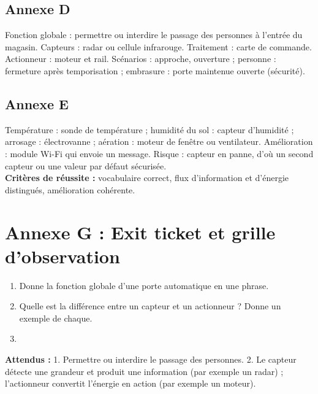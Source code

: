 \documentclass[11pt,a4paper]{article}
\begin{document}
\subsection*{Annexe D}
Fonction globale : permettre ou interdire le passage des personnes à l'entrée du magasin. Capteurs : radar ou cellule infrarouge. Traitement : carte de commande. Actionneur : moteur et rail. Scénarios : approche, ouverture ; personne : fermeture après temporisation ; embrasure : porte maintenue ouverte (sécurité).

\subsection*{Annexe E}
Température : sonde de température ; humidité du sol : capteur d'humidité ; arrosage : électrovanne ; aération : moteur de fenêtre ou ventilateur. Amélioration : module Wi-Fi qui envoie un message. Risque : capteur en panne, d'où un second capteur ou une valeur par défaut sécurisée.\\
\textbf{Critères de réussite :} vocabulaire correct, flux d'information et d'énergie distingués, amélioration cohérente.

\newpage
\section*{Annexe G : Exit ticket et grille d'observation}

\begin{enumerate}
 \item Donne la fonction globale d'une porte automatique en une phrase.\\ \lig
 \item Quelle est la différence entre un capteur et un actionneur ? Donne un exemple de chaque.\\ \lig
 \item \autoeval
\end{enumerate}
\textbf{Attendus :} 1. Permettre ou interdire le passage des personnes. 2. Le capteur détecte une grandeur et produit une information (par exemple un radar) ; l'actionneur convertit l'énergie en action (par exemple un moteur).

\bigskip
{}
\end{document}
